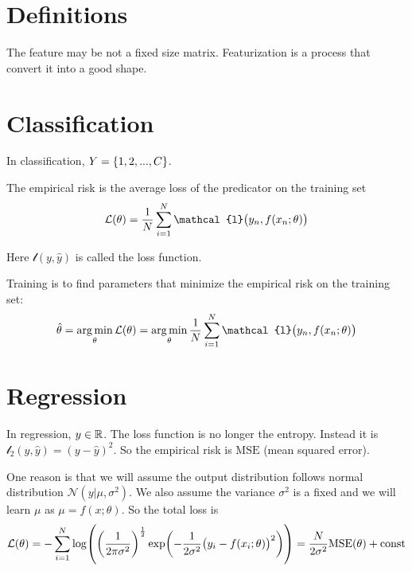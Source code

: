 \section{Definitions}




The feature may be not a fixed size matrix. Featurization is a process that convert it into a good shape.


\section{Classification}
In classification, $Y = \set{1, 2, ... , C}$.

\begin{definition}\label{empirical_risk}
    The empirical risk is the average loss of the predicator on the training set
    \begin{equation}
        \mathcal{L}(\theta) = \frac{1}{N} \sum_{i=1}^N \mathcal{l}\mleft( y_n, f(x_n; \theta) \mright)
    \end{equation}
    
    Here $\mathcal{l}(y, \hat{y})$ is called the loss function.
\end{definition}

\begin{definition}[Training]
    Training is to find parameters that minimize the empirical risk on the training set:
    \begin{equation}
        \hat{\theta} = \argmin{\theta}\mathcal{L}(\theta) = \argmin{\theta} \frac{1}{N} \sum_{i=1}^N \mathcal{l}\mleft( y_n, f(x_n; \theta) \mright)
    \end{equation}
\end{definition}

\section{Regression}

In regression, $y \in \mathbb{R}$. The loss function is no longer the entropy. Instead it is $\mathcal{l}_2 (y, \hat{y}) = (y - \hat{y})^2$. So the empirical risk is $\mathrm{MSE}$ (mean squared error).

\begin{theorem}
    One reason is that we will assume the output distribution follows normal distribution $\mathcal{N}(y|\mu,\sigma^2)$. We also assume the variance $\sigma^2$ is a fixed and we will learn $\mu$ as $\mu = f(x;\theta)$. So the total loss is
\begin{equation}
    \mathcal{L}(\theta) = - \sum_{i=1}^N \log \mleft( \mleft(\frac{1}{2\pi \sigma^2}\mright)^{\frac{1}{2}} \exp\mleft(- \frac{1}{2 \sigma^2} \mleft( y_i - f(x_i ; \theta) \mright)^2 \mright) \mright) = \frac{N}{2\sigma^2} \mathrm{MSE}(\theta) + \mathrm{const}
\end{equation}
\end{theorem}




